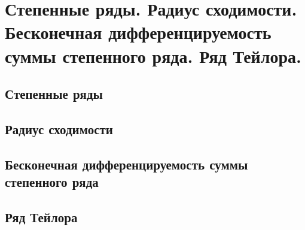 \chapter{Степенные ряды. Радиус сходимости. Бесконечная дифференцируемость суммы степенного ряда. Ряд Тейлора.}
\section{Степенные ряды}
\section{Радиус сходимости} 
\section{Бесконечная дифференцируемость суммы степенного ряда}
\section{Ряд Тейлора}
